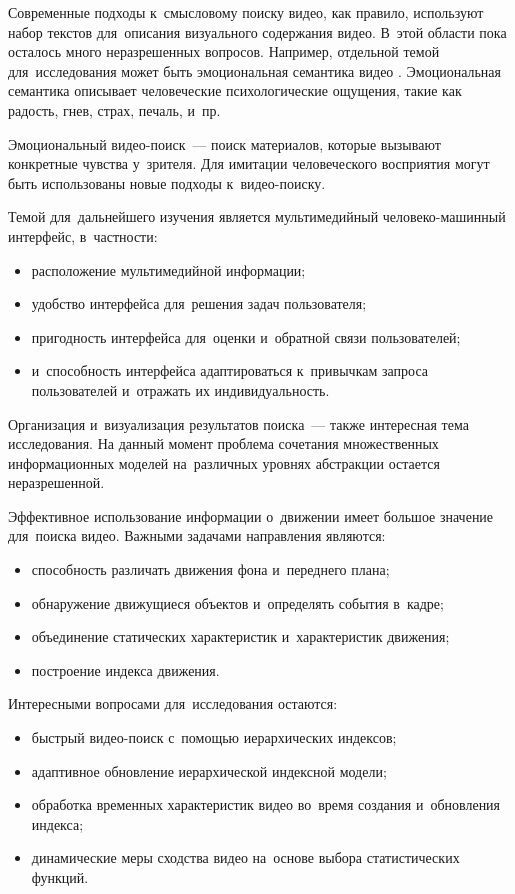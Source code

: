 Современные подходы к~смысловому поиску видео,
как правило, используют набор текстов для~описания визуального содержания видео.
В~этой области пока осталось много неразрешенных вопросов.
Например, отдельной темой для~исследования может быть
эмоциональная семантика видео \cite{Tamizharasan:2013}.
Эмоциональная семантика описывает
человеческие психологические ощущения,
такие как радость, гнев, страх, печаль, и~пр.

Эмоциональный видео-поиск~— поиск материалов,
которые вызывают конкретные чувства у~зрителя.
Для имитации человеческого восприятия могут быть использованы
новые подходы к~видео-поиску.

Темой для~дальнейшего изучения является
мультимедийный человеко-машинный интерфейс,
в~частности:
\begin{itemize}
    \item расположение мультимедийной информации;
    \item удобство интерфейса для~решения задач пользователя;
    \item пригодность интерфейса для~оценки и~обратной связи пользователей;
    \item и~способность интерфейса адаптироваться к~привычкам запроса пользователей
        и~отражать их индивидуальность.
\end{itemize}

Организация и~визуализация результатов поиска~— также
интересная тема исследования. На данный момент проблема
сочетания множественных информационных моделей
на~различных уровнях абстракции остается неразрешенной.

Эффективное использование информации о~движении имеет большое значение
для~поиска видео. Важными задачами направления являются:
\begin{itemize}
    \item способность различать движения фона и~переднего плана;
    \item обнаружение движущиеся объектов и~определять события в~кадре;
    \item объединение статических характеристик и~характеристик движения;
    \item построение индекса движения.
\end{itemize}

Интересными вопросами для~исследования остаются:
\begin{itemize}
    \item быстрый видео-поиск с~помощью иерархических индексов;
    \item адаптивное обновление иерархической индексной модели;
    \item обработка временных характеристик видео во~время создания и~обновления индекса;
    \item динамические меры сходства видео на~основе выбора статистических функций.
\end{itemize}


